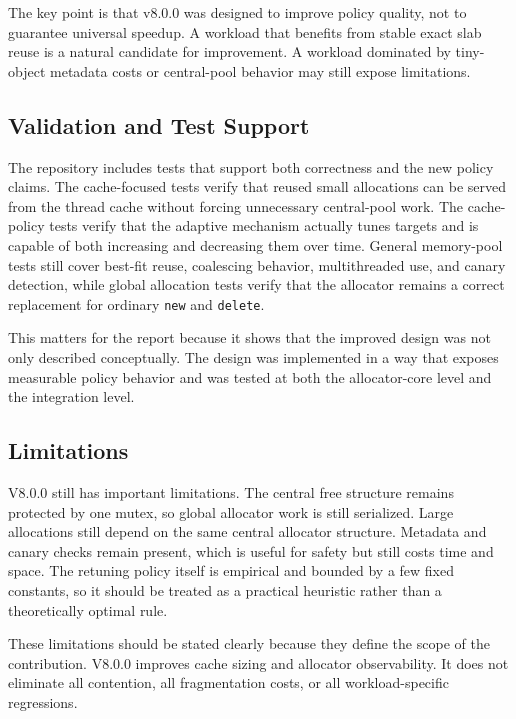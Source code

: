 The key point is that v8.0.0 was designed to improve policy quality, not to guarantee universal speedup. A
workload that benefits from stable exact slab reuse is a natural candidate for improvement. A workload
dominated by tiny-object metadata costs or central-pool behavior may still expose limitations.

\subsection{Validation and Test Support}

The repository includes tests that support both correctness and the new policy claims. The cache-focused
tests verify that reused small allocations can be served from the thread cache without forcing unnecessary
central-pool work. The cache-policy tests verify that the adaptive mechanism actually tunes targets and is
capable of both increasing and decreasing them over time. General memory-pool tests still cover best-fit reuse,
coalescing behavior, multithreaded use, and canary detection, while global allocation tests verify that the
allocator remains a correct replacement for ordinary \texttt{new} and \texttt{delete}.

This matters for the report because it shows that the improved design was not only described conceptually.
The design was implemented in a way that exposes measurable policy behavior and was tested at both the
allocator-core level and the integration level.

\subsection{Limitations}

V8.0.0 still has important limitations. The central free structure remains protected by one mutex, so global
allocator work is still serialized. Large allocations still depend on the same central allocator structure.
Metadata and canary checks remain present, which is useful for safety but still costs time and space. The
retuning policy itself is empirical and bounded by a few fixed constants, so it should be treated as a
practical heuristic rather than a theoretically optimal rule.

These limitations should be stated clearly because they define the scope of the contribution. V8.0.0
improves cache sizing and allocator observability. It does not eliminate all contention, all fragmentation
costs, or all workload-specific regressions.

